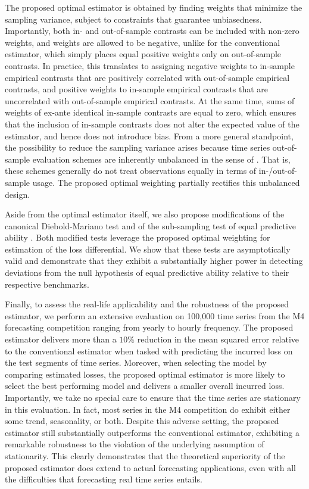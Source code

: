 \documentclass[11pt,dvipsnames]{article}
\begin{document}
The proposed optimal estimator is obtained by finding weights that minimize the sampling variance, subject to constraints that guarantee unbiasedness. Importantly, both in- and out-of-sample contrasts can be included with non-zero weights, and weights are allowed to be negative, unlike for the conventional estimator, which simply places equal positive weights only on out-of-sample contrasts. In practice, this translates to assigning negative weights to in-sample empirical contrasts that are positively correlated with out-of-sample empirical contrasts, and positive weights to in-sample empirical contrasts that are uncorrelated with out-of-sample empirical contrasts. At the same time, sums of weights of ex-ante identical in-sample contrasts are equal to zero, which ensures that the inclusion of in-sample contrasts does not alter the expected value of the estimator, and hence does not introduce bias. From a more general standpoint, the possibility to reduce the sampling variance arises because time series out-of-sample evaluation schemes are inherently unbalanced in the sense of \citet{shaoLinearModelSelection1993}. That is, these schemes generally do not treat observations equally in terms of in-/out-of-sample usage. The proposed optimal weighting partially rectifies this unbalanced design.

Aside from the optimal estimator itself, we also propose modifications of the canonical Diebold-Mariano test \citep{dieboldComparingPredictiveAccuracy1995} and of the sub-sampling test of equal predictive ability \citep{zhuCanTwoForecasts2020,ibragimovTStatisticBasedCorrelation2010}. Both modified tests leverage the proposed optimal weighting for estimation of the loss differential. We show that these tests are asymptotically valid and demonstrate that they exhibit a substantially higher power in detecting deviations from the null hypothesis of equal predictive ability relative to their respective benchmarks.

Finally, to assess the real-life applicability and the robustness of the proposed estimator, we perform an extensive evaluation on 100,000 time series from the M4 forecasting competition  \citep{makridakisM4Competition1002020} ranging from yearly to hourly frequency. The proposed estimator delivers more than a $ 10\%$ reduction in the mean squared error relative to the conventional estimator when tasked with predicting the incurred loss on the test segments of time series. Moreover, when selecting the model by comparing estimated losses, the proposed optimal estimator is more likely to select the best performing model and delivers a smaller overall incurred loss. Importantly, we take no special care to ensure that the time series are stationary in this evaluation. In fact, most series in the M4 competition do exhibit either some trend, seasonality, or both. Despite this adverse setting, the proposed estimator still substantially outperforms the conventional estimator, exhibiting a remarkable robustness to the violation of the underlying assumption of stationarity. This clearly demonstrates that the theoretical superiority of the proposed estimator does extend to actual forecasting applications, even with all the difficulties that forecasting real time series entails.
\end{document}

